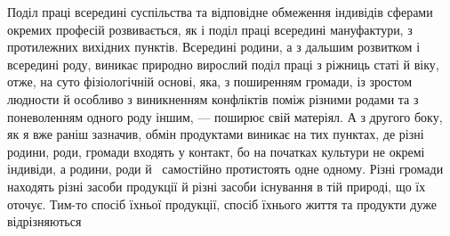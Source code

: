 Поділ праці всередині суспільства та відповідне обмеження
індивідів сферами окремих професій розвивається, як і поділ
праці всередині мануфактури, з протилежних вихідних пунктів.
Всередині родини, а з дальшим розвитком і всередині роду,
виникає природно вирослий поділ праці з ріжниць статі й віку,
отже, на суто фізіологічній основі, яка, з поширенням громади,
із зростом людности й особливо з виникненням конфліктів поміж
різними родами та з поневоленням одного роду іншим, — поширює
свій матеріял. А з другого боку, як я вже раніш зазначив,
обмін продуктами виникає на тих пунктах, де різні родини,
роди, громади входять у контакт, бо на початках культури не
окремі індивіди, а родини, роди й~ самостійно протистоять одне
одному. Різні громади находять різні засоби продукції й різні
засоби існування в тій природі, що їх оточує. Тим-то спосіб їхньої
продукції, спосіб їхнього життя та продукти дуже відрізняються
\parbreak{}  %
